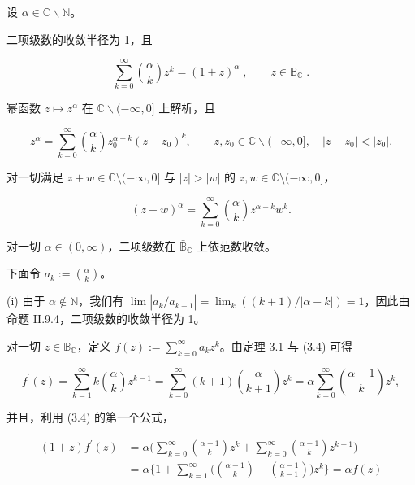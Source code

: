 \begin{theorem}

设 $ \alpha \in \mathbb{C} \backslash \mathbb{N} $。

\begin{subitems}
\item

二项级数的收敛半径为 1，且

\begin{equation}
\sum_{k=0}^{\infty}{\binom{\alpha}{k}}z^{k}=(1+z)^{\alpha}\;,\qquad z\in\mathbb{B}_{\mathbb{C}}\;.
\end{equation}
\item

幂函数 $ z \mapsto z^\alpha $ 在 $ \mathbb{C}\backslash(-\infty,0] $ 上解析，且

\[
z^{\alpha}=\sum_{k=0}^{\infty}\binom{\alpha}{k}z_{0}^{\alpha-k}(z-z_{0})^{k},\qquad z,z_{0}\in\mathbb{C}\backslash(-\infty,0],\quad|z-z_{0}|<|z_{0}|.
\]
\item

对一切满足 $ z + w \in \mathbb{C} \setminus (-\infty, 0] $ 与 $ |z| > |w| $ 的 $ z, w \in \mathbb{C} \setminus (-\infty, 0] $，

\[
(z+w)^{\alpha}=\sum_{k=0}^{\infty}\binom{\alpha}{k}z^{\alpha-k}w^{k}.
\]
\item

对一切 $ \alpha \in (0, \infty) $，二项级数在 $ \bar{\mathbb{B}}_{\mathbb{C}} $ 上依范数收敛。

\proofhead
下面令 $ a_{k} := \binom{\alpha}{k} $。
\end{subitems}

(i) 由于 $ \alpha \notin \mathbb{N} $，我们有 $ \lim |a_k/a_{k+1}| = \lim_k \left((k+1)/|\alpha - k|\right) = 1 $，因此由命题 II.9.4，二项级数的收敛半径为 1。

对一切 $ z \in \mathbb{B}_{\mathbb{C}} $，定义 $ f(z) := \sum_{k=0}^{\infty} a_k z^k $。由定理 3.1 与 (3.4) 可得

\[
f^{\prime}(z)=\sum_{k=1}^{\infty}k\binom{\alpha}{k}z^{k-1}=\sum_{k=0}^{\infty}(k+1)\binom{\alpha}{k+1}z^{k}=\alpha\sum_{k=0}^{\infty}\binom{\alpha-1}{k}z^{k},
\]

并且，利用 (3.4) 的第一个公式，

\begin{equation*}
\begin{aligned}
(1+z)f^{\prime}(z)&=\alpha\biggl(\sum_{k=0}^{\infty}\binom{\alpha-1}{k}z^{k}+\sum_{k=0}^{\infty}\binom{\alpha-1}{k}z^{k+1}\biggr)\\&=\alpha\biggl\{1+\sum_{k=1}^{\infty}\biggl(\binom{\alpha-1}{k}+\binom{\alpha-1}{k-1}\biggr)z^{k}\biggr\}=\alpha f(z)
\end{aligned}
\end{equation*}


\end{theorem}
